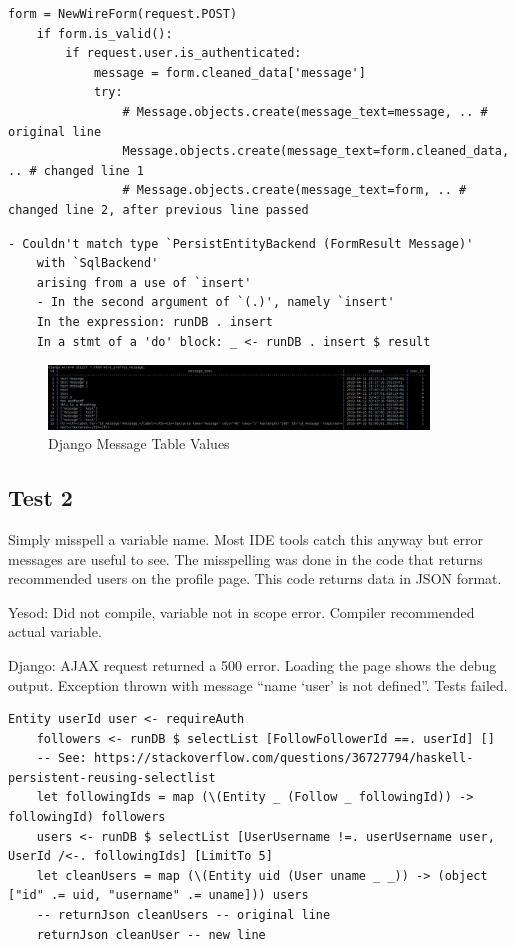 \begin{lstlisting}[caption={Django Code Change},label={code:djangoTest1LC}]
	form = NewWireForm(request.POST)
	if form.is_valid():
		if request.user.is_authenticated:
			message = form.cleaned_data['message']
			try:
				# Message.objects.create(message_text=message, .. # original line
				Message.objects.create(message_text=form.cleaned_data, .. # changed line 1
				# Message.objects.create(message_text=form, .. # changed line 2, after previous line passed
\end{lstlisting}


\begin{lstlisting}[caption={Yesod Exception Message},label={code:yesodTest1Exception}]
	- Couldn't match type `PersistEntityBackend (FormResult Message)'
	with `SqlBackend'
	arising from a use of `insert'
	- In the second argument of `(.)', namely `insert'
	In the expression: runDB . insert
	In a stmt of a 'do' block: _ <- runDB . insert $ result
\end{lstlisting}

\begin{figure}[H]
	\centering
	\includegraphics[width=0.9\textwidth]{final_report/pics/djangoMessageDB.png}
	\caption{Django Message Table Values}
	\label{fig:djangoMessageDBTest1}
\end{figure}

\subsection{Test 2}
Simply misspell a variable name. Most IDE tools catch this anyway but
error messages are useful to see. The misspelling was done in the code
that returns recommended users on the profile page. This code returns
data in JSON format.

Yesod: Did not compile, variable not in scope error. Compiler recommended
actual variable.

Django: AJAX request returned  a 500 error. Loading the page shows the
debug output. Exception thrown with message ``name `user' is not defined''.
Tests failed.

\begin{lstlisting}[caption={Yesod Code Change},label={code:yesodTest2LC}]
	Entity userId user <- requireAuth
	followers <- runDB $ selectList [FollowFollowerId ==. userId] []
	-- See: https://stackoverflow.com/questions/36727794/haskell-persistent-reusing-selectlist
	let followingIds = map (\(Entity _ (Follow _ followingId)) -> followingId) followers
	users <- runDB $ selectList [UserUsername !=. userUsername user, UserId /<-. followingIds] [LimitTo 5]
	let cleanUsers = map (\(Entity uid (User uname _ _)) -> (object ["id" .= uid, "username" .= uname])) users
	-- returnJson cleanUsers -- original line
	returnJson cleanUser -- new line
\end{lstlisting}

